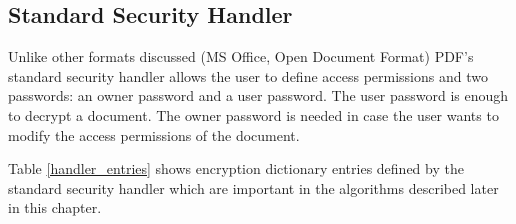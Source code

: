 \documentclass[11pt,oneside]{fithesis2}
\begin{document}
\subsection{Standard Security Handler}\label{pdf_enc}

Unlike other formats discussed (MS Office, Open Document Format) PDF's standard security handler allows the user to define access permissions and two passwords: an owner password and a user password. The user password is enough to decrypt a document. The owner password is needed in case the user wants to modify the access permissions of the document.

Table \ref{handler_entries} shows encryption dictionary entries defined by the standard security handler which are important in the algorithms described later in this chapter.
\end{document}
